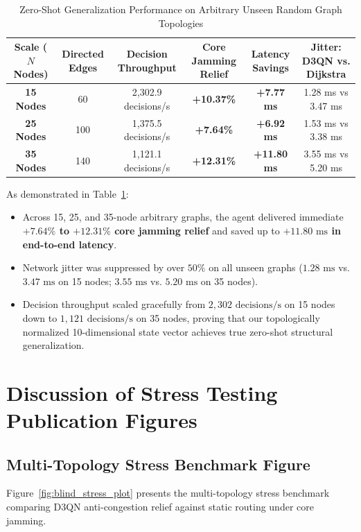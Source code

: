 \begin{table}[htbp]
\centering
\caption{Zero-Shot Generalization Performance on Arbitrary Unseen Random Graph Topologies}
\label{tab:zero_shot_generalization}
\small
\begin{tabularx}{\textwidth}{c c c c c c}
\toprule
\textbf{Scale ($N$ Nodes)} & \textbf{Directed Edges} & \textbf{Decision Throughput} & \textbf{Core Jamming Relief} & \textbf{Latency Savings} & \textbf{Jitter: D3QN vs. Dijkstra} \\
\midrule
\textbf{15 Nodes} & 60 & 2,302.9 decisions/s & \textbf{+10.37\%} & \textbf{+7.77 ms} & 1.28 ms vs 3.47 ms \\
\addlinespace
\textbf{25 Nodes} & 100 & 1,375.5 decisions/s & \textbf{+7.64\%} & \textbf{+6.92 ms} & 1.53 ms vs 3.38 ms \\
\addlinespace
\textbf{35 Nodes} & 140 & 1,121.1 decisions/s & \textbf{+12.31\%} & \textbf{+11.80 ms} & 3.55 ms vs 5.20 ms \\
\bottomrule
\end{tabularx}
\end{table}

As demonstrated in Table~\ref{tab:zero_shot_generalization}:
\begin{itemize}
    \item Across 15, 25, and 35-node arbitrary graphs, the agent delivered immediate \textbf{$+7.64\%$ to $+12.31\%$ core jamming relief} and saved up to \textbf{$+11.80\text{ ms}$ in end-to-end latency}.
    \item Network jitter was suppressed by over $50\%$ on all unseen graphs ($1.28\text{ ms}$ vs. $3.47\text{ ms}$ on 15 nodes; $3.55\text{ ms}$ vs. $5.20\text{ ms}$ on 35 nodes).
    \item Decision throughput scaled gracefully from $2,302\text{ decisions/s}$ on 15 nodes down to $1,121\text{ decisions/s}$ on 35 nodes, proving that our topologically normalized 10-dimensional state vector achieves true zero-shot structural generalization.
\end{itemize}

\section{Discussion of Stress Testing Publication Figures}

\subsection{Multi-Topology Stress Benchmark Figure}
Figure~\ref{fig:blind_stress_plot} presents the multi-topology stress benchmark comparing D3QN anti-congestion relief against static routing under core jamming.

